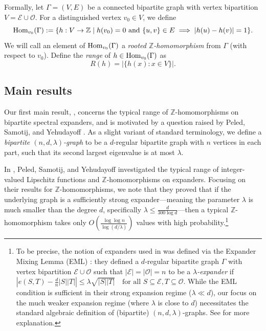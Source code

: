 \documentclass{amsart}
\theoremstyle{definition}
\newcommand{\cO}{\mathcal{O} }
\newcommand{\cE}{\mathcal{E} }
\newcommand{\0}[0]{\emptyset}
\newcommand{\Hom}[0]{\mbox{\rm{Hom}}}
\begin{document}
Formally, let $\Gamma=(V, E)$ be a connected bipartite graph with vertex bipartition $V=\cE\cup\cO$. For a distinguished vertex $v_0\in V$, we define
\[
\Hom_{v_0}(\Gamma) := \{h:V \rightarrow \mathbb Z \mid h(v_0)=0 \text{ and } \{u, v\} \in E \implies |h(u)-h(v)|=1\}.
\]
We will call an element of $\Hom_{v_0}(\Gamma)$ a \textit{rooted $\mathbb Z$-homomorphism} from $\Gamma$ (with respect to $v_0$). Define the \textit{range} of $h \in \Hom_{v_0}(\Gamma)$ as
\[R(h)=|\{h(x):x \in V\}|.\]

\subsection{Main results}

Our first main result, , concerns the typical range of $\mathbb{Z}$-homomorphisms on bipartite spectral expanders, and is motivated by a question raised by Peled, Samotij, and Yehudayoff \cite{peled2013lipschitz}. As a slight variant of standard terminology, we define a \textit{bipartite $(n,d,\lambda)$-graph} to be a $d$-regular bipartite graph with $n$ vertices in each part, such that its second largest eigenvalue is at most $\lambda$.

In \cite{peled2013lipschitz}, Peled, Samotij, and Yehudayoff investigated the typical range of integer-valued Lipschitz functions and $\mathbb Z$-homomorphisms on expanders. Focusing on their results for $\mathbb{Z}$-homomorphisms, we note that they proved that if the underlying graph is a sufficiently strong expander---meaning the parameter $\lambda$ is much smaller than the degree $d$, specifically $\lambda \le \frac{d}{300\log d}$---then a typical $\mathbb{Z}$-homomorphism takes only $O \left( \frac{\log \log n}{\log (d/\lambda)} \right)$ values with high probability.\footnote{To be precise, the notion of expanders used in \cite{peled2013lipschitz} was defined via the Expander Mixing Lemma (EML) \cite{alon1988explicit}: they defined a $d$-regular bipartite graph $\Gamma$ with vertex bipartition $\cE \cup \cO$ such that $|\cE|=|\cO|=n$ to be a \textit{$\lambda$-expander} if $\left|e(S,T)-\frac{d}{n}|S||T|\right|\le\lambda \sqrt{|S||T|} \quad \text{for all $S \subseteq \cE, T \subseteq \cO$}$. While the EML condition is sufficient in their strong expansion regime ($\lambda \ll d$), our focus on the much weaker expansion regime (where $\lambda$ is close to $d$) necessitates the standard algebraic definition of (bipartite) $(n,d,\lambda)$-graphs. See  for more explanation.} 
\end{document}
